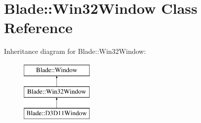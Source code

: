 \hypertarget{class_blade_1_1_win32_window}{}\section{Blade\+:\+:Win32\+Window Class Reference}
\label{class_blade_1_1_win32_window}
Inheritance diagram for Blade\+:\+:Win32\+Window\+:\begin{figure}[H]
\begin{center}
\leavevmode
\includegraphics[height=3.000000cm]{class_blade_1_1_win32_window}
\end{center}
\end{figure}
